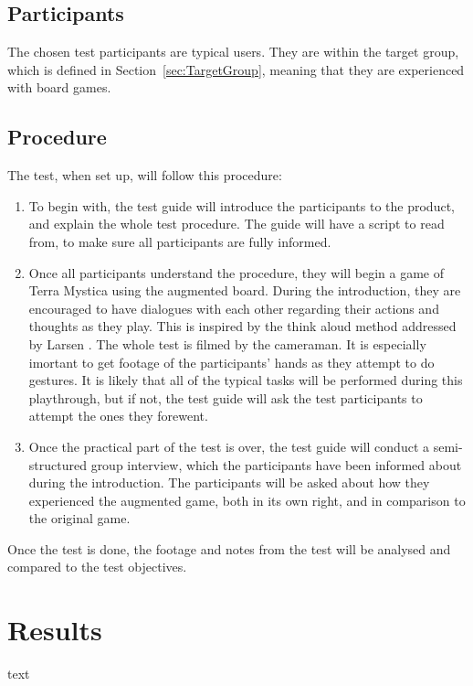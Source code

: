 \subsection{Participants}
The chosen test participants are typical users. They are within the target group, which is defined in Section~\ref{sec:TargetGroup}, meaning that they are experienced with board games. 

\subsection{Procedure}
The test, when set up, will follow this procedure:

\begin{enumerate}
\item To begin with, the test guide will introduce the participants to the product, and explain the whole test procedure. The guide will have a script to read from, to make sure all participants are fully informed.
\item Once all participants understand the procedure, they will begin a game of Terra Mystica using the augmented board. During the introduction, they are encouraged to have dialogues with each other regarding their actions and thoughts as they play. This is inspired by the think aloud method addressed by Larsen \citep{TestingLecture}. The whole test is filmed by the cameraman. It is especially imortant to get footage of the participants' hands as they attempt to do gestures. It is likely that all of the typical tasks will be performed during this playthrough, but if not, the test guide will ask the test participants to attempt the ones they forewent.
\item Once the practical part of the test is over, the test guide will conduct a semi-structured group  interview, which the participants have been informed about during the introduction. The participants will be asked about how they experienced the augmented game, both in its own right, and in comparison to the original game.
\end{enumerate}

Once the test is done, the footage and notes from the test will be analysed and compared to the test objectives.

\section{Results}
text